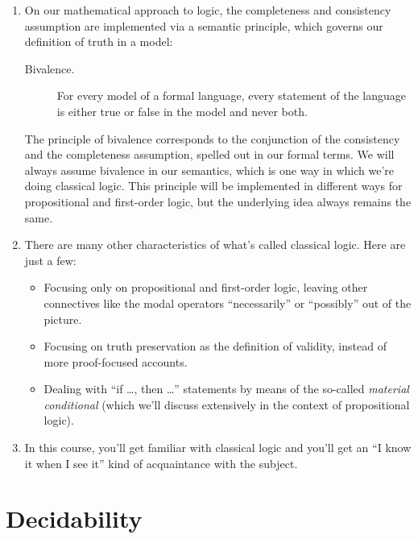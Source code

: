 \begin{enumerate}[\thesection.1]
	\item On our mathematical approach to logic, the completeness and consistency assumption are implemented via a semantic principle, which governs our definition of truth in a model:
	
	\begin{description}
	
		\item[Bivalence.] For every model of a formal language, every statement of the language is either true or false in the model and never both.
	
	\end{description}
	
	The principle of bivalence corresponds to the conjunction of the consistency and the completeness assumption, spelled out in our formal terms. We will always assume bivalence in our semantics, which is one way in which we're doing classical logic. This principle will be implemented in different ways for propositional and first-order logic, but the underlying idea always remains the same.
	
	\item There are many other characteristics of what's called classical logic. Here are just a few:
	\begin{itemize}
	
		\item Focusing only on propositional and first-order logic, leaving other connectives like the modal operators ``necessarily'' or ``possibly'' out of the picture.
		
		\item Focusing on truth preservation as the definition of validity, instead of more proof-focused accounts.
		
		\item Dealing with ``if \dots, then \dots'' statements by means of the so-called \emph{material conditional} (which we'll discuss extensively in the context of propositional logic).
			
	\end{itemize}
	
	\item In this course, you'll get familiar with classical logic and you'll get an ``I know it when I see it'' kind of acquaintance with the subject.
	
\end{enumerate}

\section{Decidability}

